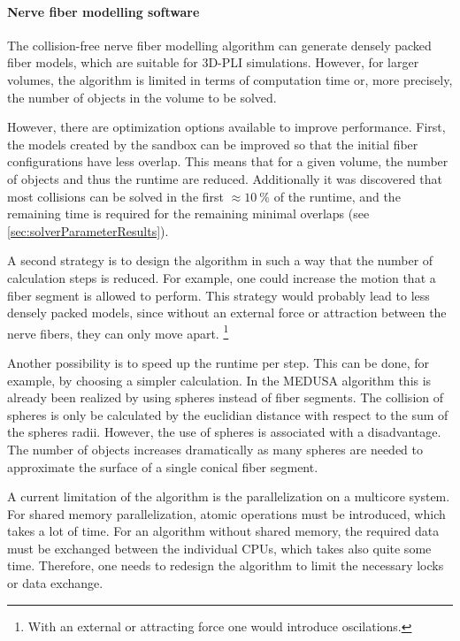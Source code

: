 \paragraph{Nerve fiber modelling software}
% 
The collision-free nerve fiber modelling algorithm can generate densely packed fiber models, which are suitable for \ac{3D-PLI} simulations.
However, for larger volumes, the algorithm is limited in terms of computation time or, more precisely, the number of objects in the volume to be solved.
\par
% 
However, there are optimization options available to improve performance.
First, the models created by the sandbox can be improved so that the initial fiber configurations have less overlap. 
This means that for a given volume, the number of objects and thus the runtime are reduced. 
Additionally it was discovered that most collisions can be solved in the first $\approx \SI{10}{\percent}$ of the runtime, and the remaining time is required for the remaining minimal overlaps (see \cref{sec:solverParameterResults}).
\par
% 
A second strategy is to design the algorithm in such a way that the number of calculation steps is reduced.
For example, one could increase the motion that a fiber segment is allowed to perform.
This strategy would probably lead to less densely packed models, since without an external force or attraction between the nerve fibers, they can only move apart. \footnote{With an external or attracting force one would introduce oscilations.}
% 
\par
Another possibility is to speed up the runtime per step.
This can be done, for example, by choosing a simpler calculation.
In the \ac{MEDUSA} algorithm this is already been realized by using spheres instead of fiber segments.
The collision of spheres is only be calculated by the euclidian distance with respect to the sum of the spheres radii.
However, the use of spheres is associated with a disadvantage.
The number of objects increases dramatically as many spheres are needed to approximate the surface of a single conical fiber segment.
\par
% 
A current limitation of the algorithm is the parallelization on a multicore system.
For shared memory parallelization, atomic operations must be introduced, which takes a lot of time.
For an algorithm without shared memory, the required data must be exchanged between the individual CPUs, which takes also quite some time. 
Therefore, one needs to redesign the algorithm to limit the necessary locks or data exchange.
